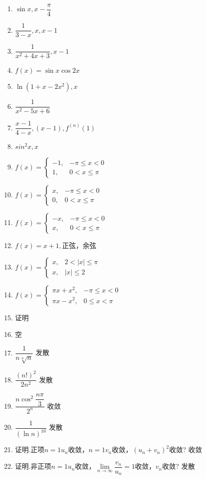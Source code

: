 \documentclass[UTF8,a4paper,12pt,scheme=chinese]{ctexart}
\begin{document}
\begin{enumerate}
	\item 	$ \sin x,x-\dfrac{\pi}{4} $
	\item 	$ \dfrac{1}{3-x},x,x-1 $
	\item 	$ \dfrac{1}{x^2+4x+3},x-1 $
	\item 	$ f(x)=\sin x \cos 2x $
	\item 	$ \ln(1+x-2x^2),x $
	\item 	$ \dfrac{1}{x^2-5x+6} $
	\item 	$ \dfrac{x-1}{4-x},(x-1),f^{(n)}(1) $
	\item 	$ sin^2x,x $
	\item 	$ f(x)=\left\lbrace \begin{array}{ll}-1,&-\pi\leq x{<}0\\1,&0{<}x\leq\pi\end{array} \right. $
	\item 	$ f(x)=\left\lbrace \begin{array}{ll}x,&-\pi\leq x{<}0\\0,&0{<}x\leq\pi\end{array} \right. $
	\item 	$ f(x)=\left\lbrace \begin{array}{ll}-x,&-\pi\leq x{<}0\\x,&0{<}x\leq\pi\end{array} \right. $
	\item 	$ f(x)=x+1, $正弦，余弦
	\item 	$ f(x)=\left\lbrace \begin{array}{ll}x,&2{<}|x|\leq\pi\\x,&|x|\leq2\end{array} \right. $
	\item 	$ f(x)=\left\lbrace \begin{array}{ll}\pi x+x^2,&-\pi\leq x{<}0\\\pi x-x^2,&0\leq x{<}\pi\end{array} \right. $
	\item 	证明
	\item 	空
	\item 	$ \dfrac{1}{n\sqrt[n]{n}} $	发散
	\item 	$ \dfrac{(n!)^2}{2n^2} $	发散
	\item 	$ \dfrac{n\cos^2\dfrac{n\pi}{3}}{2^n} $	收敛
	\item 	$ \dfrac{1}{(\ln n)^10} $	发散
	\item 	证明.正项$n=1 u_n $收敛，$n=1 v_n $收敛，$ (u_n+v_n)^2 $收敛?	收敛
	\item 	证明.非正项$n=1 u_n $收敛，$\lim\limits_{n\rightarrow \infty}\dfrac{v_n}{u_n}=1$收敛，$ v_n $收敛?	发散

\end{enumerate}
\end{document}
